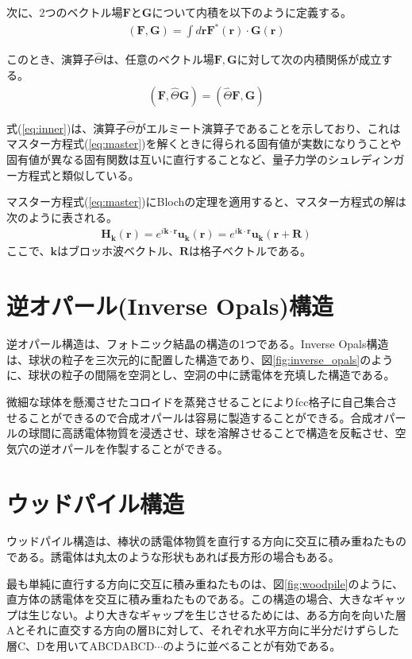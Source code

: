 \documentclass[platex,dvipdfmx]{jsreport}
\numberwithin{equation}{section}
\begin{document}
次に、2つのベクトル場$\bm{F}$と$\bm{G}$について内積を以下のように定義する。
\begin{align}
  (\bm{F}, \bm{G}) = \int d\bm{r} \bm{F}^*(\bm{r}) \cdot \bm{G}(\bm{r})
\end{align}

このとき、演算子$\hat{\Theta}$は、任意のベクトル場$\bm{F}, \bm{G}$に対して次の内積関係が成立する。
\begin{align}
  \label{eq:inner}
  (\bm{F}, \hat{\Theta} \bm{G}) = (\hat{\Theta} \bm{F}, \bm{G})
\end{align}

式(\ref{eq:inner})は、演算子$\hat{\Theta}$がエルミート演算子であることを示しており、これはマスター方程式(\ref{eq:master})を解くときに得られる固有値が実数になりうことや固有値が異なる固有関数は互いに直行することなど、量子力学のシュレディンガー方程式と類似している。

マスター方程式(\ref{eq:master})にBlochの定理を適用すると、マスター方程式の解は次のように表される。
\begin{align}
  \bm{H}_{\bm{k}}(\bm{r}) = e^{i \bm{k} \cdot \bm{r}} \bm{u}_{\bm{k}}(\bm{r}) = e^{i \bm{k} \cdot \bm{r}} \bm{u}_{\bm{k}}(\bm{r + R})
\end{align}
ここで、$\bm{k}$はブロッホ波ベクトル、$\bm{R}$は格子ベクトルである。

\section{逆オパール(Inverse Opals)構造}
逆オパール構造は、フォトニック結晶の構造の1つである。Inverse Opals構造は、球状の粒子を三次元的に配置した構造であり、図\ref{fig:inverse_opals}のように、球状の粒子の間隔を空洞とし、空洞の中に誘電体を充填した構造である。

微細な球体を懸濁させたコロイドを蒸発させることによりfcc格子に自己集合させることができるので合成オパールは容易に製造することができる。合成オパールの球間に高誘電体物質を浸透させ、球を溶解させることで構造を反転させ、空気穴の逆オパールを作製することができる。

\section{ウッドパイル構造}
ウッドパイル構造は、棒状の誘電体物質を直行する方向に交互に積み重ねたものである。誘電体は丸太のような形状もあれば長方形の場合もある。

最も単純に直行する方向に交互に積み重ねたものは、図\ref{fig:woodpile}のように、直方体の誘電体を交互に積み重ねたものである。この構造の場合、大きなギャップは生じない。より大きなギャップを生じさせるためには、ある方向を向いた層Aとそれに直交する方向の層Bに対して、それぞれ水平方向に半分だけずらした層C、Dを用いてABCDABCD$\cdots$のように並べることが有効である。
\end{document}
